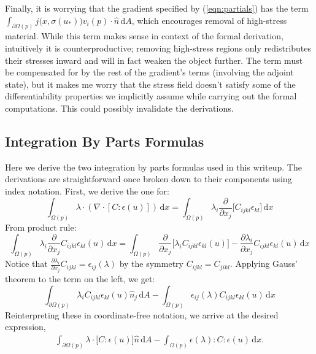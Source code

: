 \documentclass[10pt]{article}
\renewcommand{\div}{\nabla \cdot}
\providecommand{\shape}{\Omega(p)}
\providecommand{\boundary}{\partial \shape}
\providecommand{\vint}[1]{\int_{\shape} \! #1 \, \mathrm{d}x}
\providecommand{\sint}[1]{\int_{\boundary} \! #1 \, \mathrm{d}A}
\providecommand{\pder}[2]{\frac{\partial #1}{\partial #2}}
\begin{document}
Finally, it is worrying that the gradient specified by (\ref{eqn:partials}) has
the term $\sint{j\big(x, \sigma(u_*)\big) v_i(p) \cdot \hat{n}}$, which encourages
removal of high-stress material. While this term makes sense in context of the
formal derivation, intuitively it is counterproductive; removing high-stress
regions only redistributes their stresses inward and will in fact weaken the
object further. The term must be compensated for by the rest of the gradient's
terms (involving the adjoint state), but it makes me worry that the stress
field doesn't satisfy some of the differentiability properties we implicitly
assume while carrying out the formal computations. This could possibly
invalidate the derivations.

\begin{appendices}
    \section{Integration By Parts Formulas}
    \label{sec:IBP}
    Here we derive the two integration by parts formulas used in this writeup. The
    derivations are straightforward once broken down to their components using
    index notation. First, we derive the one for:
    $$
    \vint{\lambda \cdot \left(\div \left[ C:\epsilon(u)\right]\right)} =
    \vint{\lambda_i \pder{}{x_j}\big[C_{ijkl} \epsilon_{kl}\big]}
    $$
    From product rule:
    $$
    \vint{\lambda_i \pder{}{x_j}C_{ijkl} \epsilon_{kl}(u)} =
    \vint{\pder{}{x_j} \big[\lambda_i C_{ijkl} \epsilon_{kl}(u)\big] - \pder{\lambda_i}{x_j} C_{ijkl} \epsilon_{kl}(u)}
    $$
    Notice that $\pder{\lambda_i}{x_j} C_{ijkl} = \epsilon_{ij}(\lambda)$ by
    the symmetry $C_{ijkl} = C_{jikl}$. Applying Gauss' theorem to the term on the left, we get:
    $$
    \sint{\lambda_i C_{ijkl} \epsilon_{kl}(u)\hat{n}_j} - \vint{\epsilon_{ij}(\lambda)C_{ijkl} \epsilon_{kl}(u)}
    $$
    Reinterpreting these in coordinate-free notation, we arrive at the desired expression,
    \begin{align}
    \sint{\lambda \cdot \big[C : \epsilon(u) \big]\hat{n}} - \vint{\epsilon(\lambda) : C : \epsilon(u)}.
    \label{eqn:IBP_1}
    \end{align}


\end{appendices}
\end{document}
